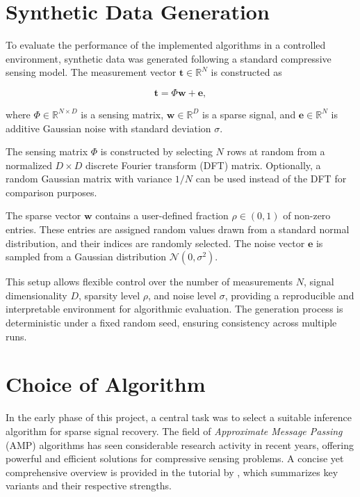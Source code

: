 \documentclass{article}
\begin{document}
\section{Synthetic Data Generation}

To evaluate the performance of the implemented algorithms in a controlled environment, synthetic data was generated following a standard compressive sensing model. The measurement vector $ \mathbf{t} \in \mathbb{R}^N $ is constructed as

\begin{equation}
    \mathbf{t} = \Phi \mathbf{w} + \mathbf{e},
\end{equation}

where $ \Phi \in \mathbb{R}^{N \times D} $ is a sensing matrix, $ \mathbf{w} \in \mathbb{R}^{D} $ is a sparse signal, and $ \mathbf{e} \in \mathbb{R}^{N} $ is additive Gaussian noise with standard deviation $ \sigma $.

The sensing matrix $ \Phi $ is constructed by selecting $ N $ rows at random from a normalized $ D \times D $ discrete Fourier transform (DFT) matrix. Optionally, a random Gaussian matrix with variance $1/N$ can be used instead of the DFT for comparison purposes.

The sparse vector $ \mathbf{w} $ contains a user-defined fraction $ \rho \in (0, 1) $ of non-zero entries. These entries are assigned random values drawn from a standard normal distribution, and their indices are randomly selected. The noise vector $ \mathbf{e} $ is sampled from a Gaussian distribution $ \mathcal{N}(0, \sigma^2) $.

This setup allows flexible control over the number of measurements $ N $, signal dimensionality $ D $, sparsity level $ \rho $, and noise level $ \sigma $, providing a reproducible and interpretable environment for algorithmic evaluation. The generation process is deterministic under a fixed random seed, ensuring consistency across multiple runs.


\section{Choice of Algorithm}

In the early phase of this project, a central task was to select a suitable inference algorithm for sparse signal recovery. The field of \emph{Approximate Message Passing} (AMP) algorithms has seen considerable research activity in recent years, offering powerful and efficient solutions for compressive sensing problems. A concise yet comprehensive overview is provided in the tutorial by \citet{zou2022concise}, which summarizes key variants and their respective strengths.
\end{document}
